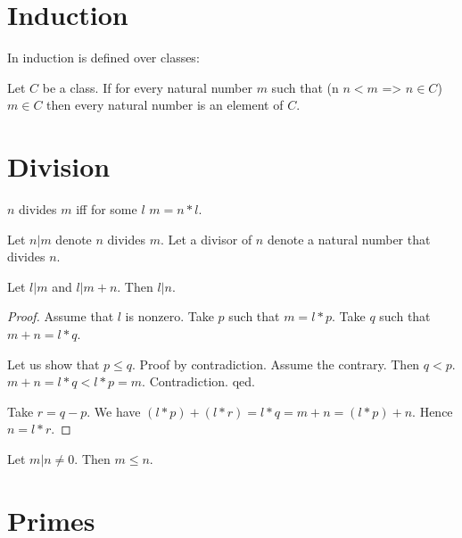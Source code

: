 \documentclass[11pt]{article}
\begin{document}
\section{Induction}

In \Naproche{} induction is defined over classes:

\begin{forthel}
\begin{axiom}[Induction]
  Let $C$ be a class.
  If for every natural number $m$ such that (\forall n $n < m$ => $n \in C$) $m \in C$
    then every natural number is an element of $C$.
\end{axiom}
\end{forthel}

\section{Division}

\begin{forthel}

\begin{definition}
  $n$ divides $m$ iff for some $l$ $m = n * l$.
\end{definition}

Let $n | m$ denote $n$ divides $m$.
Let a divisor of $n$ denote a natural number 
that divides $n$.

\begin{lemma} Let $l | m$ and $l | m + n$. Then $l | n$.
\end{lemma}

\begin{proof}
Assume that $l$ is nonzero.
Take $p$ such that $m = l * p$. 
Take $q$ such that $m + n = l * q$.

Let us show that 
$p \leq q$.
Proof by contradiction.
Assume the contrary. Then $q < p$.
$m+n = l * q < l * p = m$.
Contradiction. qed.

Take $r = q - p$.
We have $(l * p) + (l * r) = l * q = m + n = (l * p) + n$.
Hence $n = l * r$.
\end{proof}

\begin{lemma} Let $m | n \neq 0$. Then $m \leq n$.
\end{lemma}

\end{forthel}

\section{Primes}
\end{document}
